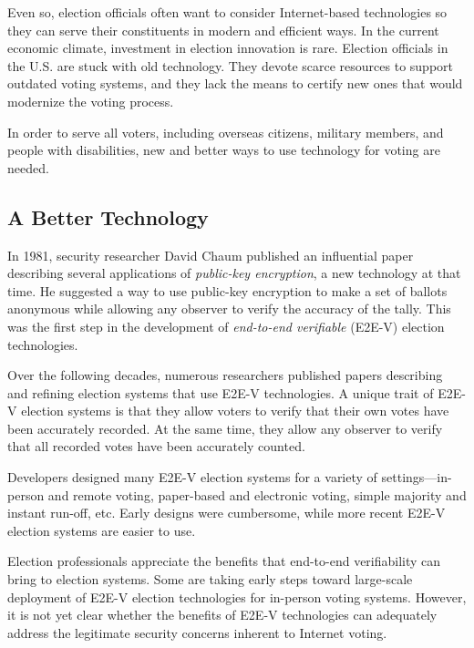 Even so, election officials often want to consider Internet-based
technologies so they can serve their constituents in modern and
efficient ways. In the current economic climate, investment in
election innovation is rare. Election officials in the U.S. are stuck
with old technology. They devote scarce resources to support outdated
voting systems, and they lack the means to certify new ones that would
modernize the voting process.

In order to serve all voters, including overseas citizens, military
members, and people with disabilities, new and better ways to use
technology for voting are needed.

\subsection{A Better Technology}
\label{sec:better-technology}

In 1981, security researcher David Chaum published an influential
paper describing several applications of \emph{public-key encryption},
a new technology at that time. He suggested a way to use public-key
encryption to make a set of ballots anonymous while allowing any
observer to verify the accuracy of the tally. This was the first step
in the development of \emph{end-to-end verifiable} (E2E-V) election
technologies.

Over the following decades, numerous researchers published papers
describing and refining election systems that use E2E-V
technologies. A unique trait of E2E-V election systems is that they
allow voters to verify that their own votes have been accurately
recorded. At the same time, they allow any observer to verify that all
recorded votes have been accurately counted.

Developers designed many E2E-V election systems for a variety of
settings---in-person and remote voting, paper-based and electronic
voting, simple majority and instant run-off, etc. Early designs were
cumbersome, while more recent E2E-V election systems are easier to
use.

Election professionals appreciate the benefits that end-to-end
verifiability can bring to election systems. Some are taking early
steps toward large-scale deployment of E2E-V election technologies for
in-person voting systems. However, it is not yet clear whether the
benefits of E2E-V technologies can adequately address the legitimate
security concerns inherent to Internet voting.

